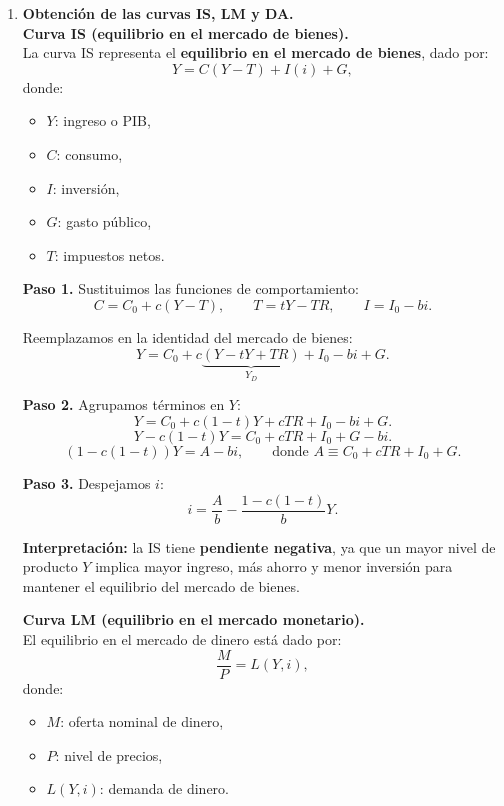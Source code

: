 \documentclass[11pt,addpoints]{article}
\begin{document}
\begin{enumerate}

\item \textbf{Obtención de las curvas IS, LM y DA.}\\

\textbf{Curva IS (equilibrio en el mercado de bienes).}\\
La curva IS representa el \textbf{equilibrio en el mercado de bienes}, dado por:
\[
Y = C(Y - T) + I(i) + G,
\]
donde:
\begin{itemize}
  \item \(Y\): ingreso o PIB,
  \item \(C\): consumo,
  \item \(I\): inversión,
  \item \(G\): gasto público,
  \item \(T\): impuestos netos.
\end{itemize}

\textbf{Paso 1.} Sustituimos las funciones de comportamiento:
\[
C = C_0 + c(Y - T), \qquad T = tY - TR, \qquad I = I_0 - b i.
\]

Reemplazamos en la identidad del mercado de bienes:
\[
Y = C_0 + c\underbrace{(Y - tY + TR)}_{Y_D} + I_0 - b i + G.
\]


\textbf{Paso 2.} Agrupamos términos en \(Y\):
\[
Y = C_0 + c(1-t)Y + cTR + I_0 - b i + G.
\]
\[
Y - c(1-t)Y = C_0 + cTR + I_0 + G - b i.
\]
\[
(1 - c(1-t))Y = A - b i, \qquad \text{donde } A \equiv C_0 + cTR + I_0 + G.
\]

\textbf{Paso 3.} Despejamos \(i\):
\[
i = \frac{A}{b} - \frac{1 - c(1-t)}{b}Y.
\]

\textbf{Interpretación:} la IS tiene \textbf{pendiente negativa}, ya que un mayor nivel de producto \(Y\) implica mayor ingreso, más ahorro y menor inversión para mantener el equilibrio del mercado de bienes.

\newpage
\vspace*{0.1cm}
\textbf{Curva LM (equilibrio en el mercado monetario).}\\
El equilibrio en el mercado de dinero está dado por:
\[
\frac{M}{P} = L(Y,i),
\]
donde:
\begin{itemize}
  \item \(M\): oferta nominal de dinero,
  \item \(P\): nivel de precios,
  \item \(L(Y,i)\): demanda de dinero.
\end{itemize}


\end{enumerate}
\end{document}
